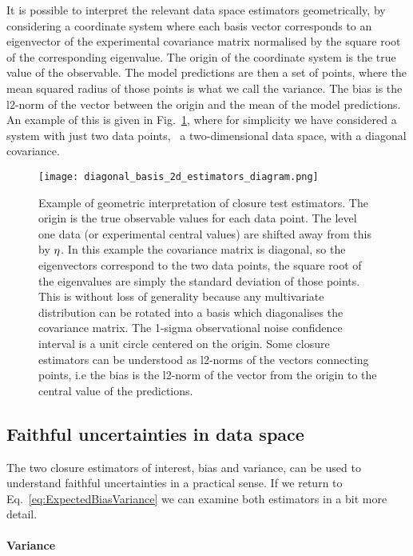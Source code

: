 It is possible to interpret the relevant data space estimators geometrically, by
considering a coordinate system where each basis vector corresponds to an
eigenvector of the experimental covariance matrix normalised by the square root
of the corresponding eigenvalue. The origin of the coordinate system is the true
value of the observable. The model predictions are then a set of points, where
the mean squared radius of those points is what we call the variance. The bias
is the l2-norm of the vector between the origin and the mean of the model
predictions. An example of this is given in Fig.~\ref{fig:diagram2destimators},
where for simplicity we have considered a system with just two data points, \ie\
a two-dimensional data space, with a diagonal covariance.
%
\begin{figure}
    \centering
    \texttt{[image: diagonal\_basis\_2d\_estimators\_diagram.png]}
    \caption{Example of geometric interpretation of closure test estimators.
    The origin
    is the true observable values for each data point. The level one data (or
    experimental central values) are
    shifted away from this by $\eta$. In this example the covariance matrix
    is diagonal, so the eigenvectors correspond to the two data points, the
    square root of the eigenvalues are simply the standard deviation of those
    points. This is without loss of generality because any multivariate distribution
    can be rotated into a basis which diagonalises the covariance matrix.
    The 1-sigma observational noise confidence interval
    is a unit circle centered on the origin. Some closure
    estimators can be understood as l2-norms of the vectors connecting points,
    i.e the bias is the l2-norm of the vector from the origin to the central
    value of the predictions.}
    \label{fig:diagram2destimators}
\end{figure}
%
\subsection{Faithful uncertainties in data space}

The two closure estimators of interest, bias and variance, can be used to
understand faithful uncertainties in a practical sense. If we return to
Eq.~\ref{eq:ExpectedBiasVariance} we can examine both estimators in a bit more
detail.

\paragraph{Variance}

